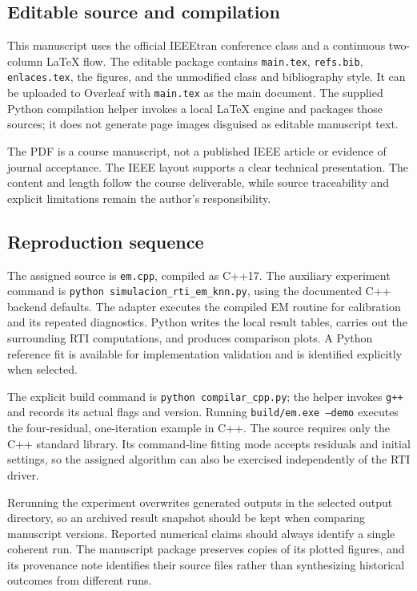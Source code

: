 \documentclass[conference,letterpaper]{IEEEtran}
\begin{document}
\subsection{Editable source and compilation}
This manuscript uses the official IEEEtran conference class and a continuous two-column LaTeX flow. The editable package contains \texttt{main.tex}, \texttt{refs.bib}, \texttt{enlaces.tex}, the figures, and the unmodified class and bibliography style. It can be uploaded to Overleaf with \texttt{main.tex} as the main document. The supplied Python compilation helper invokes a local LaTeX engine and packages those sources; it does not generate page images disguised as editable manuscript text.

The PDF is a course manuscript, not a published IEEE article or evidence of journal acceptance. The IEEE layout supports a clear technical presentation. The content and length follow the course deliverable, while source traceability and explicit limitations remain the author's responsibility.

\subsection{Reproduction sequence}
The assigned source is \texttt{em.cpp}, compiled as C++17. The auxiliary experiment command is \texttt{python simulacion\_rti\_em\_knn.py}, using the documented C++ backend defaults. The adapter executes the compiled EM routine for calibration and its repeated diagnostics. Python writes the local result tables, carries out the surrounding RTI computations, and produces comparison plots. A Python reference fit is available for implementation validation and is identified explicitly when selected.

The explicit build command is \texttt{python compilar\_cpp.py}; the helper invokes \texttt{g++} and records its actual flags and version. Running \texttt{build/em.exe --demo} executes the four-residual, one-iteration example in C++. The source requires only the C++ standard library. Its command-line fitting mode accepts residuals and initial settings, so the assigned algorithm can also be exercised independently of the RTI driver.

Rerunning the experiment overwrites generated outputs in the selected output directory, so an archived result snapshot should be kept when comparing manuscript versions. Reported numerical claims should always identify a single coherent run. The manuscript package preserves copies of its plotted figures, and its provenance note identifies their source files rather than synthesizing historical outcomes from different runs.
\end{document}
